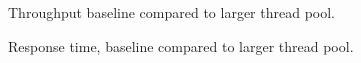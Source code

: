 \begin{figure}[ht]
 \centering
 \caption{Throughput baseline compared to larger thread pool.}
 \label{graph_tp_tput}
\end{figure}

\begin{figure}[ht]
 \centering
 \caption{Response time, baseline compared to larger thread pool.}
 \label{graph_tp_rt}
\end{figure}

